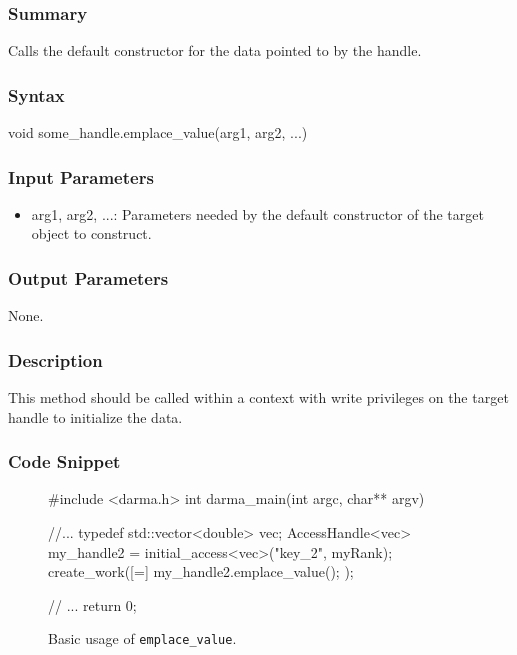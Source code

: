 \hspace{0.1cm} %
\begin{subs}
\vspace{-1.2cm}

\subsubsection{Summary} 
Calls the default constructor for the data pointed to by the handle.

\subsubsection{Syntax} 
\begin{CppCode}
void some_handle.emplace_value(arg1, arg2, ...)
\end{CppCode}

\subsubsection{Input Parameters} 
\begin{itemize}
\item arg1, arg2, ...: Parameters needed by the default 
constructor of the target object to construct.
\end{itemize}

\subsubsection{Output Parameters} 
None.

\subsubsection{Description} 
This method should be called within a context with write privileges 
on the target handle to initialize the data.


\subsubsection{Code Snippet} 
\begin{figure}[!h]
\begin{CppCodeNumb}
#include <darma.h>
int darma_main(int argc, char** argv)
{
	//...
  typedef std::vector<double> vec;
  AccessHandle<vec> my_handle2 = initial_access<vec>("key_2", myRank);
  create_work([=]{
  	my_handle2.emplace_value();
  });

  // ... 
  return 0;
}
\end{CppCodeNumb}
\label{fig:fe_api_initialaccess}
\caption{Basic usage of \texttt{emplace\_value}.}
\end{figure}

\end{subs}



